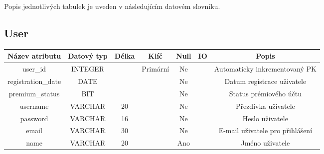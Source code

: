 Popis jednotlivých tabulek je uveden v následujícím datovém slovníku.

\subsection*{User}
\begin{tabular}{ |c|c c c c c|c| }
    \hline
    \textbf{Název atributu} & \textbf{Datový typ} & \textbf{Délka} & \textbf{Klíč} & \textbf{Null} & \textbf{IO} & \textbf{Popis}                         \\
    \hline
    user\_id                & INTEGER             &                & Primární      & Ne            &             & Automaticky inkrementovaný PK   \\
    registration\_date      & DATE                &                &               & Ne            &             & Datum registrace uživatele      \\
    premium\_status         & BIT                 &                &               & Ne            &             & Status prémiového účtu          \\
    username                & VARCHAR             & 20             &               & Ne            &             & Přezdívka uživatele             \\
    password                & VARCHAR             & 16             &               & Ne            &             & Heslo uživatele                 \\
    email                   & VARCHAR             & 30             &               & Ne            &             & E-mail uživatele pro přihlášení \\
    name                    & VARCHAR             & 20             &               & Ano           &             & Jméno uživatele                 \\
    \hline
\end{tabular}
\bigskip

